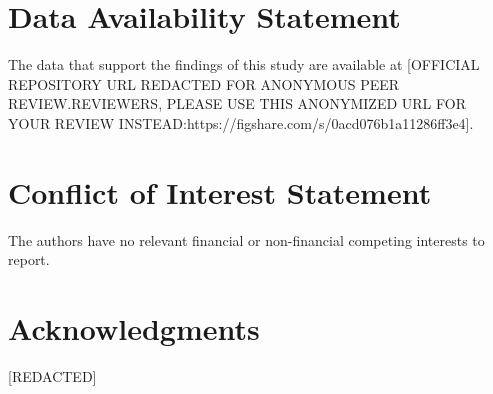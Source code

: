 \documentclass[12pt,letterpaper]{article} %
\begin{document}
\section*{Data Availability Statement}

The data that support the findings of this study are available at [OFFICIAL REPOSITORY URL REDACTED FOR ANONYMOUS PEER REVIEW.\@ REVIEWERS, PLEASE USE THIS ANONYMIZED URL FOR YOUR REVIEW INSTEAD:\@ https://figshare.com/s/0acd076b1a11286ff3e4].

\section*{Conflict of Interest Statement}

The authors have no relevant financial or non-financial competing interests to report.

\section*{Acknowledgments}

[REDACTED]


\setlength{\bibsep}{0.00cm plus 0.05cm} %


\end{document}
